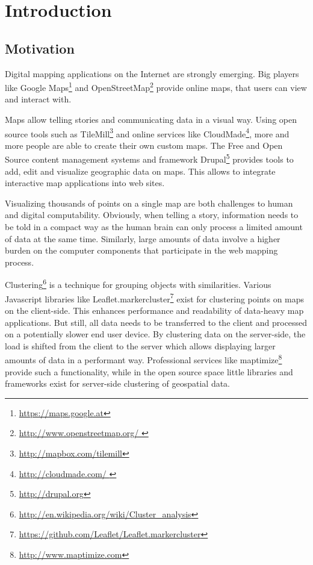 
%
%

\chapter{Introduction}


\section{Motivation}

Digital mapping applications on the Internet are strongly emerging. Big players like Google Maps\footnote{\url{https://maps.google.at}} and OpenStreetMap\footnote{\url{http://www.openstreetmap.org/ }} provide online maps, that users can view and interact with. 

Maps allow telling stories and communicating data in a visual way. Using open source tools such as TileMill\footnote{\url{http://mapbox.com/tilemill}} and online services like CloudMade\footnote{\url{http://cloudmade.com/ }}, more and more people are able to create their own custom maps. The Free and Open Source content management systems and framework Drupal\footnote{\url{http://drupal.org}} provides tools to add, edit and visualize geographic data on maps. This allows to integrate interactive map applications into web sites.

Visualizing thousands of points on a single map are both challenges to human and digital computability. Obviously, when telling a story, information needs to be told in a compact way as the human brain can only process a limited amount of data at the same time. Similarly, large amounts of data involve a higher burden on the computer components that participate in the web mapping process.

Clustering\footnote{\url{http://en.wikipedia.org/wiki/Cluster_analysis}} is a technique for grouping objects with similarities. Various Javascript libraries like Leaflet.markercluster\footnote{\url{https://github.com/Leaflet/Leaflet.markercluster}} exist for clustering points on maps on the client-side. This enhances performance and readability of data-heavy map applications. But still, all data needs to be transferred to the client and processed on a potentially slower end user device. By clustering data on the server-side, the load is shifted from the client to the server which allows displaying larger amounts of data in a performant way. Professional services like maptimize\footnote{\url{http://www.maptimize.com}} provide such a functionality, while in the open source space little libraries and frameworks exist for server-side clustering of geospatial data.

